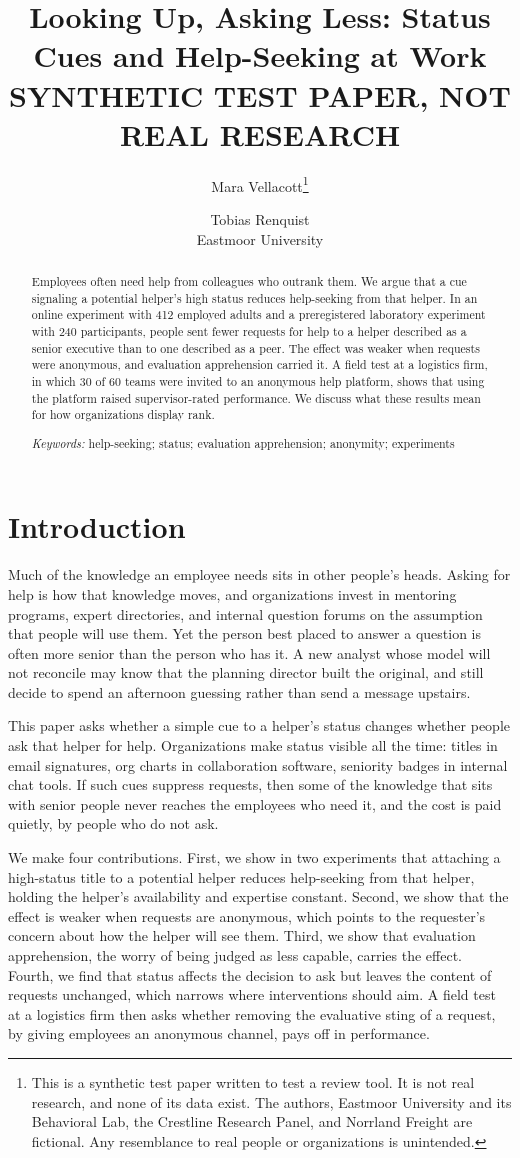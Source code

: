 \documentclass[11pt]{article}
\title{Looking Up, Asking Less: Status Cues and Help-Seeking at Work\\[1em]
\normalsize\textbf{SYNTHETIC TEST PAPER, NOT REAL RESEARCH}}
\author{Mara Vellacott\thanks{This is a synthetic test paper written to test a review tool. It is not real research, and none of its data exist. The authors, Eastmoor University and its Behavioral Lab, the Crestline Research Panel, and Norrland Freight are fictional. Any resemblance to real people or organizations is unintended.} \and Tobias Renquist\\[0.5em]
\small Eastmoor University}
\date{}
\begin{document}
\maketitle

\begin{abstract}
\noindent Employees often need help from colleagues who outrank them. We argue that a cue signaling a potential helper's high status reduces help-seeking from that helper. In an online experiment with 412 employed adults and a preregistered laboratory experiment with 240 participants, people sent fewer requests for help to a helper described as a senior executive than to one described as a peer. The effect was weaker when requests were anonymous, and evaluation apprehension carried it. A field test at a logistics firm, in which 30 of 60 teams were invited to an anonymous help platform, shows that using the platform raised supervisor-rated performance. We discuss what these results mean for how organizations display rank.

\medskip
\noindent\textit{Keywords:} help-seeking; status; evaluation apprehension; anonymity; experiments
\end{abstract}

\section{Introduction}

Much of the knowledge an employee needs sits in other people's heads. Asking for help is how that knowledge moves, and organizations invest in mentoring programs, expert directories, and internal question forums on the assumption that people will use them. Yet the person best placed to answer a question is often more senior than the person who has it. A new analyst whose model will not reconcile may know that the planning director built the original, and still decide to spend an afternoon guessing rather than send a message upstairs.

This paper asks whether a simple cue to a helper's status changes whether people ask that helper for help. Organizations make status visible all the time: titles in email signatures, org charts in collaboration software, seniority badges in internal chat tools. If such cues suppress requests, then some of the knowledge that sits with senior people never reaches the employees who need it, and the cost is paid quietly, by people who do not ask.

We make four contributions. First, we show in two experiments that attaching a high-status title to a potential helper reduces help-seeking from that helper, holding the helper's availability and expertise constant. Second, we show that the effect is weaker when requests are anonymous, which points to the requester's concern about how the helper will see them. Third, we show that evaluation apprehension, the worry of being judged as less capable, carries the effect. Fourth, we find that status affects the decision to ask but leaves the content of requests unchanged, which narrows where interventions should aim. A field test at a logistics firm then asks whether removing the evaluative sting of a request, by giving employees an anonymous channel, pays off in performance.
\end{document}
